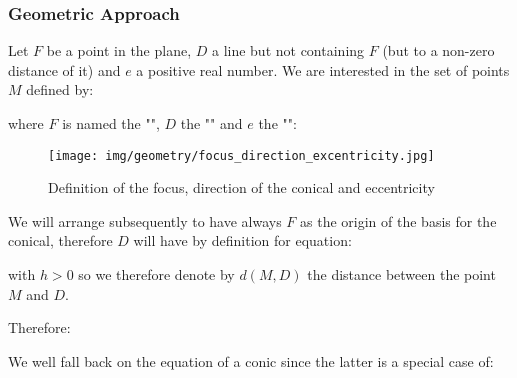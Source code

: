	\pagebreak
	\subsubsection{Geometric Approach}
	Let $F$ be a point in the plane, $D$ a line but not containing $F$ (but to a non-zero distance of it) and $e$ a positive real number. We are interested in the set of points $M$ defined by:
	
	where $F$ is named the "", $D$ the "" and $e$ the "\label{eccentricity}":
	\begin{figure}[H]
		\centering
		\texttt{[image: img/geometry/focus\_direction\_excentricity.jpg]}
		\caption{Definition of the focus, direction of the conical and eccentricity}
	\end{figure}
	We will arrange subsequently to have always $F$ as the origin of the basis for the conical, therefore $D$ will have by definition for equation:
	
	with $h>0$ so we therefore denote by $d (M, D)$ the distance between the point $M$ and $D$.
	
	Therefore:
	
	We well fall back on the equation of a conic since the latter is a special case of:
	
